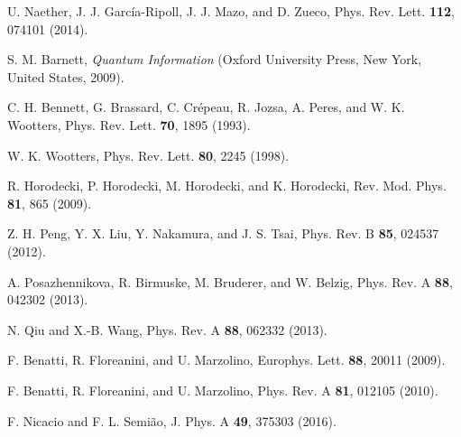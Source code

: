 \documentclass[%
reprint,
amsmath,amssymb,
aps,
pra,
]{revtex4-1}
\begin{document}
\begin{thebibliography}{99}
 U. Naether, J. J. Garc\'ia-Ripoll, J. J. Mazo, and D. Zueco, Phys. Rev. Lett. \textbf{112}, 074101 (2014).

 S. M. Barnett, \textit{Quantum Information} (Oxford University Press, New York, United States, 2009).

 C. H. Bennett, G. Brassard, C. Cr\'epeau, R. Jozsa, A. Peres, and W. K. Wootters, Phys. Rev. Lett. \textbf{70}, 1895 (1993).

 W. K. Wootters, Phys. Rev. Lett. \textbf{80}, 2245 (1998).

 R. Horodecki, P. Horodecki, M. Horodecki, and K. Horodecki, Rev. Mod. Phys. \textbf{81}, 865 (2009).

 Z. H. Peng, Y. X. Liu, Y. Nakamura, and J. S. Tsai, Phys. Rev. B \textbf{85}, 024537 (2012).

 A. Posazhennikova, R. Birmuske, M. Bruderer, and W. Belzig, Phys. Rev. A \textbf{88}, 042302 (2013).

 N. Qiu and X.-B. Wang, Phys. Rev. A \textbf{88}, 062332 (2013).

 F. Benatti, R. Floreanini, and U. Marzolino, Europhys. Lett. \textbf{88}, 20011 (2009).

 F. Benatti, R. Floreanini, and U. Marzolino, Phys. Rev. A \textbf{81}, 012105 (2010).

 F. Nicacio and F. L. Semi\~ao, J. Phys. A \textbf{49}, 375303 (2016).
%
\end{thebibliography}
\end{document}
